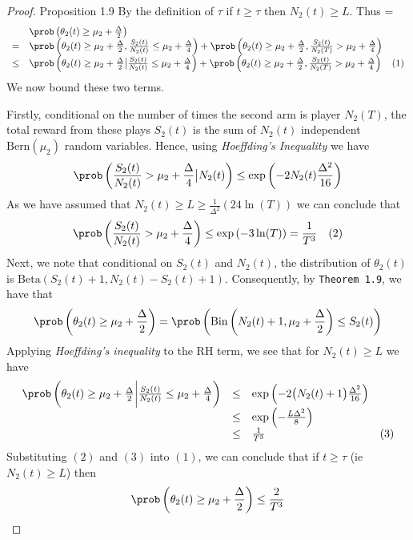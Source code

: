 \documentclass[11pt,a4paper]{article}
\begin{document}
  \begin{proof}{Proposition 1.9}
    By the definition of $\tau$ if $t\geq\tau$ then $N_2(t)\geq L$. Thus
    \everymath={\displaystyle}
    \[\begin{array}{rlll}
    &\prob\left(\theta_2(t)\geq\mu_2+\frac\Delta2\right)\\
    =&\prob\left(\theta_2(t)\geq\mu_2+\frac\Delta2,\frac{S_2(t)}{N_2(t)}\leq\mu_2+\frac\Delta4\right)+\prob\left(\theta_2(t)\geq\mu_2+\frac\Delta2,\frac{S_2(t)}{N_2(T)}>\mu_2+\frac\Delta4\right)\\
    \leq&\prob\left(\theta_2(t)\geq\mu_2+\frac\Delta2\big|\frac{S_2(t)}{N_2(t)}\leq\mu_2+\frac\Delta4\right)+\prob\left(\theta_2(t)\geq\mu_2+\frac\Delta2,\frac{S_2(t)}{N_2(T)}>\mu_2+\frac\Delta4\right)&(1)\\
    \end{array}\]
    We now bound these two terms.
    \par Firstly, conditional on the number of times the second arm is player $N_2(T)$, the total reward from these plays $S_2(t)$ is the sum of $N_2(t)$ independent $\text{Bern}(\mu_2)$ random variables. Hence, using \textit{Hoeffding's Inequality} we have
    \[ \prob\left(\frac{S_2(t)}{N_2(t)}>\mu_2+\frac\Delta4\big|N_2(t)\right)\leq\exp\left(-2N_2(t)\frac{\Delta^2}{16}\right) \]
    As we have assumed that $N_2(t)\geq L\geq\frac1{\Delta^2}(24\ln(T))$ we can conclude that
    \[ \prob\left(\frac{S_2(t)}{N_2(t)}>\mu_2+\frac\Delta4\right)\leq\exp\left(-3\ln(T)\right)=\frac1{T^3}\quad(2) \]
    Next, we note that conditional on $S_2(t)$ and $N_2(t)$, the distribution of $\theta_2(t)$ is $\text{Beta}(S_2(t)+1,N_2(t)-S_2(t)+1)$. Consequently, by \texttt{Theorem 1.9}, we have that
    \[ \prob\left(\theta_2(t)\geq\mu_2+\frac\Delta2\right)=\prob\left(\text{Bin}\left(N_2(t)+1,\mu_2+\frac\Delta2\right)\leq S_2(t)\right) \]
    Applying \textit{Hoeffding's inequality} to the RH term, we see that for $N_2(t)\geq L$ we have
    \[\begin{array}{rcll}
      \prob\left(\theta_2(t)\geq\mu_2+\frac\Delta2\bigg|\frac{S_2(t)}{N_2(t)}\leq\mu_2+\frac\Delta4\right)&\leq&\exp\left(-2\big(N_2(t)+1\big)\frac{\Delta^2}{16}\right)\\
      &\leq&\exp\left(-\frac{L\Delta^2}8\right)\\
      &\leq&\frac1{T^3}&(3)
    \end{array}\]
    Substituting $(2)$ and $(3)$ into $(1)$, we can conclude that if $t\geq\tau$ (ie $N_2(t)\geq L$) then
    \[ \prob\left(\theta_2(t)\geq\mu_2+\frac\Delta2\right)\leq\frac2{T^3} \]
    \hfill\proved
  \end{proof}
\end{document}
